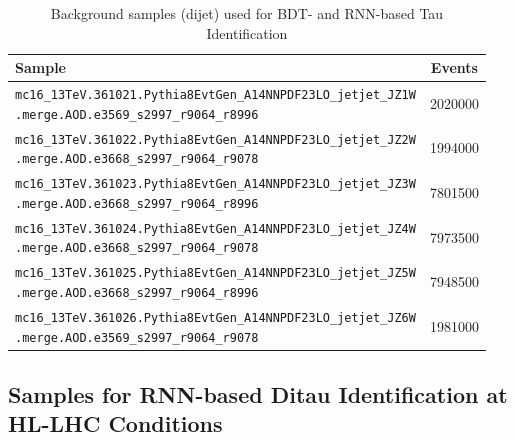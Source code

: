 \begin{table}[htbp]
  \centering
  {\small
  \begin{tabular}{p{13cm}S[table-format=7.0]}
    \toprule
    Sample & {Events} \\
    \midrule
    \texttt{mc16\_13TeV.361021.Pythia8EvtGen\_A14NNPDF23LO\_jetjet\_JZ1W\newline\hspace*{1em}.merge.AOD.e3569\_s2997\_r9064\_r8996} & 2020000 \\
    \texttt{mc16\_13TeV.361022.Pythia8EvtGen\_A14NNPDF23LO\_jetjet\_JZ2W\newline\hspace*{1em}.merge.AOD.e3668\_s2997\_r9064\_r9078} & 1994000 \\
    \texttt{mc16\_13TeV.361023.Pythia8EvtGen\_A14NNPDF23LO\_jetjet\_JZ3W\newline\hspace*{1em}.merge.AOD.e3668\_s2997\_r9064\_r8996} & 7801500 \\
    \texttt{mc16\_13TeV.361024.Pythia8EvtGen\_A14NNPDF23LO\_jetjet\_JZ4W\newline\hspace*{1em}.merge.AOD.e3668\_s2997\_r9064\_r9078} & 7973500 \\
    \texttt{mc16\_13TeV.361025.Pythia8EvtGen\_A14NNPDF23LO\_jetjet\_JZ5W\newline\hspace*{1em}.merge.AOD.e3668\_s2997\_r9064\_r8996} & 7948500 \\
    \texttt{mc16\_13TeV.361026.Pythia8EvtGen\_A14NNPDF23LO\_jetjet\_JZ6W\newline\hspace*{1em}.merge.AOD.e3569\_s2997\_r9064\_r9078} & 1981000 \\
    \bottomrule
  \end{tabular}
  }
  \caption[Background samples used for BDT- and RNN-based Tau
  Identification]{Background samples (dijet) used for BDT- and RNN-based Tau
    Identification}
  \label{tab:samples_preprod_dijets}
\end{table}

\clearpage
\subsection{Samples for RNN-based Ditau Identification at HL-LHC Conditions}
\label{app:upgrade_samples}


